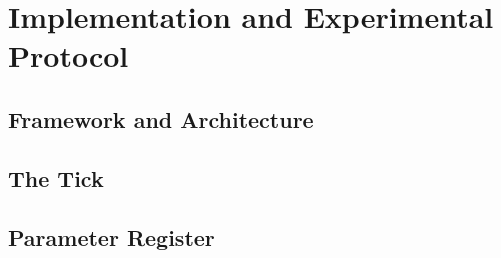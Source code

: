 \chapter{Implementation and Experimental Protocol}
\label{ch:implementation}


\section{Framework and Architecture}
\label{sec:implementation-architecture}


\section{The Tick}
\label{sec:implementation-tick}


\section{Parameter Register}
\label{sec:parameters}

